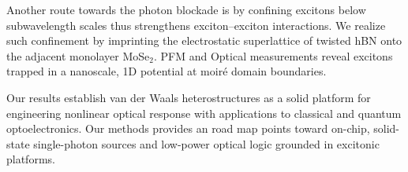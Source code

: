 Another route towards the photon blockade is by confining excitons below subwavelength scales thus strengthens exciton--exciton interactions.  
We realize such confinement by imprinting the electrostatic superlattice of twisted hBN onto the adjacent monolayer MoSe$_2$.
PFM and Optical measurements reveal excitons trapped in a nanoscale, 1D potential at moiré domain boundaries.

Our results establish van der Waals heterostructures as a solid platform for engineering nonlinear optical response with applications to classical and quantum optoelectronics.
Our methods provides an road map points toward on-chip, solid-state single-photon sources and low-power optical logic grounded in excitonic platforms.
